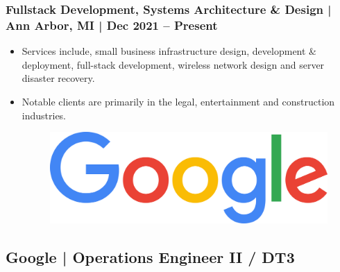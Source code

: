 \documentclass[letter,10pt]{article}
\begin{document}
\subsubsection*{Fullstack Development, Systems Architecture \& Design | Ann Arbor, MI | Dec 2021 – Present}
\label{sec:org39ded2f}
\begin{itemize}
\item Services include, small business infrastructure design, development \& deployment, full-stack development, wireless network design and server disaster recovery.
\label{sec:org7f0644b}
\item Notable clients are primarily in the legal, entertainment and construction industries.
\label{sec:org1ed2c1c}



\begin{figure}
\includegraphics[width=0.85\linewidth]{./img/cr_google.jpg}
\end{figure}
\end{itemize}

\subsection*{Google | Operations Engineer II / DT3}
\label{sec:org9b60447}
\end{document}
